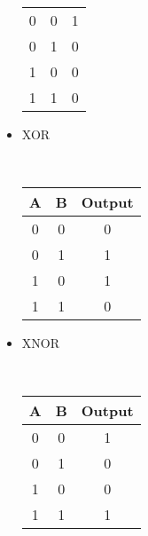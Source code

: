 \begin{itemize}
\begin{tabular}{|c|c|c|}
              \hline
              0 & 0 & 1      \\
              0 & 1 & 0      \\
              1 & 0 & 0      \\
              1 & 1 & 0      \\
              \hline
          \end{tabular}
    \item XOR \\
          \\
          \begin{tabular}{|c|c|c|}
              \hline
              A & B & Output \\
              \hline
              0 & 0 & 0      \\
              0 & 1 & 1      \\
              1 & 0 & 1      \\
              1 & 1 & 0      \\
              \hline
          \end{tabular}
    \item XNOR \\
          \\
          \begin{tabular}{|c|c|c|}
              \hline
              A & B & Output \\
              \hline
              0 & 0 & 1      \\
              0 & 1 & 0      \\
              1 & 0 & 0      \\
              1 & 1 & 1      \\
              \hline
          \end{tabular}
\end{itemize}